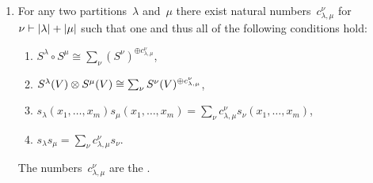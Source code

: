 \documentclass[a4paper,10pt]{scrartcl}
\begin{document}
\begin{example}
\begin{enumerate}
    \item
      For any two partitions~$\lambda$ and~$\mu$ there exist natural numbers~$c^{\nu}_{\lambda, \mu}$ for~$\nu \vdash \lvert\lambda\rvert + \lvert\mu\rvert$ such that one and thus all of the following conditions hold:
      \begin{enumerate}
        \item
          $S^\lambda \circ S^\mu \cong \sum_\nu (S^\nu)^{\oplus c_{\lambda, \mu}^{\nu}}$,
        \item
          $S^\lambda(V) \otimes S^\mu(V) \cong \sum_\nu S^\nu(V)^{\oplus c_{\lambda, \mu}^{\nu}}$,
        \item
          $s_\lambda(x_1, \dotsc, x_m) s_\mu(x_1, \dotsc, x_m) = \sum_{\nu} c_{\lambda, \mu}^\nu s_\nu(x_1, \dotsc, x_m)$,
        \item
          $s_\lambda s_\mu = \sum_{\nu} c_{\lambda, \mu}^{\nu} s_\nu$.
      \end{enumerate}
      The numbers~$c_{\lambda, \mu}^{\nu}$ are the .
  \end{enumerate}
\end{example}
\end{document}
